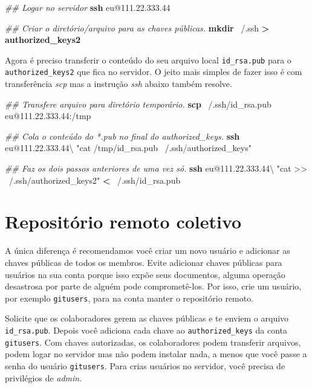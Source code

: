 \documentclass[
  a5paper,
  pagesize,
  9pt,
  pointlessnumbers,
  normalheadings,
  twoside=false
]{book}
\newenvironment{Shaded}{\begin{snugshade}}{\end{snugshade}}
\newcommand{\KeywordTok}[1]{\textcolor[rgb]{0.13,0.29,0.53}{\textbf{{#1}}}}
\newcommand{\StringTok}[1]{\textcolor[rgb]{0.31,0.60,0.02}{{#1}}}
\newcommand{\CommentTok}[1]{\textcolor[rgb]{0.56,0.35,0.01}{\textit{{#1}}}}
\newcommand{\NormalTok}[1]{{#1}}
\begin{document}
\begin{Shaded}
\begin{Highlighting}[]
\CommentTok{## Logar no servidor}
\KeywordTok{ssh} \NormalTok{eu@111.22.333.44}

\CommentTok{## Criar o diretório/arquivo para as chaves públicas.}
\KeywordTok{mkdir} \NormalTok{~/.ssh}
 \KeywordTok{>} \KeywordTok{authorized_keys2}
\end{Highlighting}
\end{Shaded}

Agora é preciso transferir o conteúdo do seu arquivo local
\texttt{id\_rsa.pub} para o \texttt{authorized\_keys2} que fica no
servidor. O jeito mais simples de fazer isso é com transferência
\emph{scp} mas a instrução \emph{ssh} abaixo também resolve.

\begin{Shaded}
\begin{Highlighting}[]
\CommentTok{## Transfere arquivo para diretório temporário.}
\KeywordTok{scp} \NormalTok{~/.ssh/id_rsa.pub eu@111.22.333.44:/tmp}

\CommentTok{## Cola o conteúdo do *.pub no final do authorized_keys.}
\KeywordTok{ssh} \NormalTok{eu@111.22.333.44\textbackslash{}}
  \StringTok{"cat /tmp/id_rsa.pub ~/.ssh/authorized_keys"}

\CommentTok{## Faz os dois passos anteriores de uma vez só.}
\KeywordTok{ssh} \NormalTok{eu@111.22.333.44\textbackslash{}}
  \StringTok{"cat >> ~/.ssh/authorized_keys2"} \KeywordTok{<} \NormalTok{~/.ssh/id_rsa.pub}
\end{Highlighting}
\end{Shaded}

\section{Repositório remoto coletivo}\label{repositorio-remoto-coletivo}

A única diferença é recomendamos você criar um novo usuário e adicionar
as chaves públicas de todos os membros. Evite adicionar chaves públicas
para usuários na sua conta porque isso expõe seus documentos, alguma
operação desastrosa por parte de alguém pode comprometê-los. Por isso,
crie um usuário, por exemplo \texttt{gitusers}, para na conta manter o
repositório remoto.

Solicite que os colaboradores gerem as chaves públicas e te enviem o
arquivo \texttt{id\_rsa.pub}. Depois você adiciona cada chave ao
\texttt{authorized\_keys} da conta \texttt{gitusers}. Com chaves
autorizadas, os colaboradores podem transferir arquivos, podem logar no
servidor mas não podem instalar nada, a menos que você passe a senha do
usuário \texttt{gitusers}. Para crias usuários no servidor, você precisa
de privilégios de \emph{admin}.
\end{document}
